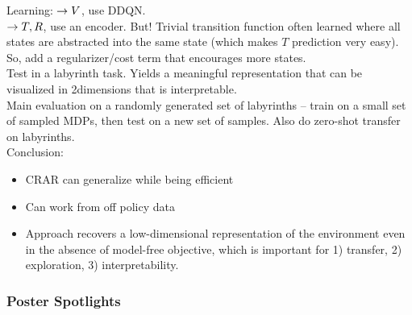 Learning: 
$\rightarrow V$, use DDQN.  \\
$\rightarrow T,R$, use an encoder. But! Trivial transition function often learned where all states are abstracted into the same state (which makes $T$ prediction very easy). \\

So, add a regularizer/cost term that encourages more states. \\

Test in a labyrinth task. Yields a meaningful representation that can be visualized in 2dimensions that is interpretable. \\


Main evaluation on a randomly generated set of labyrinths -- train on a small set of sampled MDPs, then test on a new set of samples. Also do zero-shot transfer on labyrinths. \\

Conclusion:
\begin{itemize}
    \item CRAR can generalize while being efficient
    \item Can work from off policy data
    \item Approach recovers a low-dimensional representation of the environment even in the absence of model-free objective, which is important for 1) transfer, 2) exploration, 3) interpretability.
\end{itemize}


\subsubsection{Poster Spotlights}

